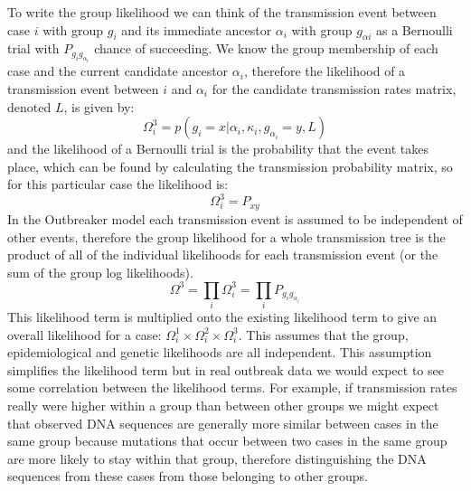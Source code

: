 \documentclass[11pt,a4paper]{report}
\begin{document}
To write the group likelihood we can think of the transmission event between case $i$ with group $g_i$ and its immediate ancestor $\alpha_i$ with group $g_{\alpha{i}}$ as a Bernoulli trial with $P_{g_i g_{\alpha_i}}$ chance of succeeding. We know the group membership of each case and the current candidate ancestor $\alpha_i$, therefore the likelihood of a transmission event between $i$ and $\alpha_i$ for the candidate transmission rates matrix, denoted $L$, is given by:
\[ \Omega_i^3 = p(g_i = x | \alpha_i, \kappa_i, g_{\alpha_i}=y, L) \]
and the likelihood of a Bernoulli trial is the probability that the event takes place, which can be found by calculating the transmission probability matrix, so for this particular case the likelihood is:
\[ \Omega_i^3 = P_{xy} \]
In the Outbreaker model each transmission event is assumed to be independent of other events, therefore the group likelihood for a whole transmission tree is the product of all of the individual likelihoods for each transmission event (or the sum of the group log likelihoods).
\[ \Omega^3 = \prod_i{\Omega_i^3} = \prod_i{P_{g_i g_{\alpha_i}}} \]
This likelihood term is multiplied onto the existing likelihood term to give an overall likelihood for a case: $\Omega_i^1 \times \Omega_i^2 \times \Omega_i^3$. This assumes that the group, epidemiological and genetic likelihoods are all independent. This assumption simplifies the likelihood term but in real outbreak data we would expect to see some correlation between the likelihood terms. For example, if transmission rates really were higher within a group than between other groups we might expect that observed DNA sequences are generally more similar between cases in the same group because mutations that occur between two cases in the same group are more likely to stay within that group, therefore distinguishing the DNA sequences from these cases from those belonging to other groups.
\end{document}

